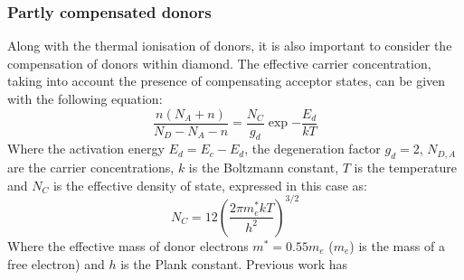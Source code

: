 \subsubsection{Partly compensated donors}
Along with the thermal ionisation of donors, it is also important to consider the compensation of donors within diamond. The effective carrier concentration, taking into account the presence of compensating acceptor states, can be given with the following equation:
\begin{equation}
    \frac{n\left(N_{A}+n\right)}{N_{D}-N_{A}-n} = \frac{N_{C}}{g_{d}}\exp{-\frac{E_{d}}{kT}}
    \label{eq:carrier_compensation_koizumi2018}
\end{equation}
Where the activation energy $E_{d}=E_{c}-E_{d}$, the degeneration factor $g_{d} = 2$, $N_{D,A}$ are the carrier concentrations, $k$ is the Boltzmann constant, $T$ is the temperature and $N_{C}$ is the effective density of state, expressed in this case as:
\begin{equation}
    N_{C} = 12\left(\frac{2\pi m^{*}_{e}kT}{h^{2}}\right)^{3/2}
    \label{eq:carrier_compensation_density_of_state}
\end{equation}
Where the effective mass of donor electrons $m^{*} = 0.55m_{e}$ ($m_{e}$) is the mass of a free electron) and $h$ is the Plank constant. Previous work has 
